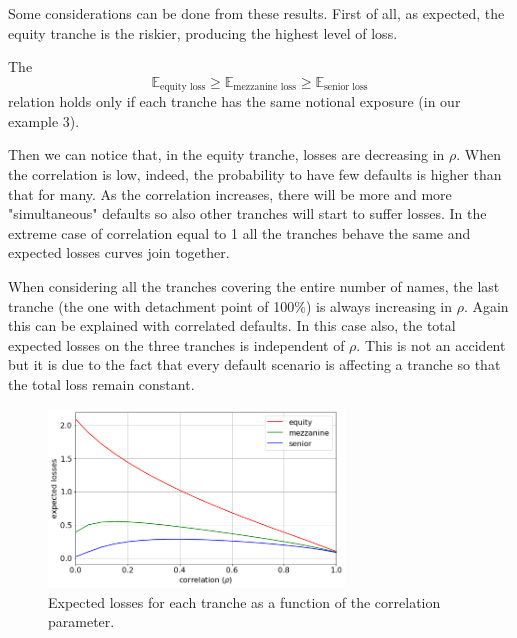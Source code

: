 Some considerations can be done from these results. First of all, as expected, the equity tranche is the riskier, producing the highest level of loss. 

The 
\begin{equation}
\mathbb{E}_{\textrm{equity loss}} \ge \mathbb{E}_{\textrm{mezzanine loss}} \ge \mathbb{E}_{\textrm{senior loss}}
\end{equation}
relation holds only if each tranche has the same notional exposure (in our example 3).

Then we can notice that, in the equity tranche, losses are decreasing in $\rho$. When the correlation is low, indeed, the probability to have few defaults is higher than that for many. As the correlation increases, there will be more and more "simultaneous" defaults so also other tranches will start to suffer losses. In the extreme case of correlation equal to 1 all the tranches behave the same and expected losses curves join together. 

When considering all the tranches covering the entire number of names, the last tranche (the one with detachment point of 100\%) is always increasing in $\rho$. Again this can be explained with correlated defaults. In this case also, the total expected losses on the three tranches is independent of $\rho$. This is not an accident but it is due to the fact that every default scenario is affecting a tranche so that the total loss remain constant.

\begin{figure}[htb]
	\centering
	\includegraphics[width=0.7\textwidth]{figures/losses_vs_rho}
	\caption{Expected losses for each tranche as a function of the correlation parameter.}
	\label{fig:losses_rho}
\end{figure}

